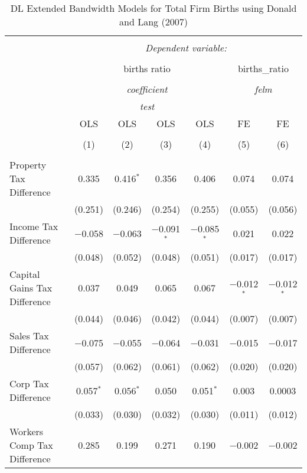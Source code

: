
\begin{table}[!htbp] \centering 
  \caption{DL Extended Bandwidth Models for  Total Firm Births using Donald and Lang (2007)} 
  \label{} 
\begin{tabular}{@{\extracolsep{5pt}}lcccccc} 
\\[-1.8ex]\hline 
\hline \\[-1.8ex] 
 & \multicolumn{6}{c}{\textit{Dependent variable:}} \\ 
\cline{2-7} 
\\[-1.8ex] & \multicolumn{4}{c}{births ratio} & \multicolumn{2}{c}{births\_ratio} \\ 
\\[-1.8ex] & \multicolumn{4}{c}{\textit{coefficient}} & \multicolumn{2}{c}{\textit{felm}} \\ 
 & \multicolumn{4}{c}{\textit{test}} & \multicolumn{2}{c}{\textit{}} \\ 
 & OLS & OLS & OLS & OLS & FE & FE \\ 
\\[-1.8ex] & (1) & (2) & (3) & (4) & (5) & (6)\\ 
\hline \\[-1.8ex] 
 Property Tax Difference & 0.335 & 0.416$^{*}$ & 0.356 & 0.406 & 0.074 & 0.074 \\ 
  & (0.251) & (0.246) & (0.254) & (0.255) & (0.055) & (0.056) \\ 
  Income Tax Difference & $-$0.058 & $-$0.063 & $-$0.091$^{*}$ & $-$0.085$^{*}$ & 0.021 & 0.022 \\ 
  & (0.048) & (0.052) & (0.048) & (0.051) & (0.017) & (0.017) \\ 
  Capital Gains Tax Difference & 0.037 & 0.049 & 0.065 & 0.067 & $-$0.012$^{*}$ & $-$0.012$^{*}$ \\ 
  & (0.044) & (0.046) & (0.042) & (0.044) & (0.007) & (0.007) \\ 
  Sales Tax Difference & $-$0.075 & $-$0.055 & $-$0.064 & $-$0.031 & $-$0.015 & $-$0.017 \\ 
  & (0.057) & (0.062) & (0.061) & (0.062) & (0.020) & (0.020) \\ 
  Corp Tax Difference & 0.057$^{*}$ & 0.056$^{*}$ & 0.050 & 0.051$^{*}$ & 0.003 & 0.0003 \\ 
  & (0.033) & (0.030) & (0.032) & (0.030) & (0.011) & (0.012) \\ 
  Workers Comp Tax Difference & 0.285 & 0.199 & 0.271 & 0.190 & $-$0.002 & $-$0.002 \\ 

\end{tabular}
\end{table}
